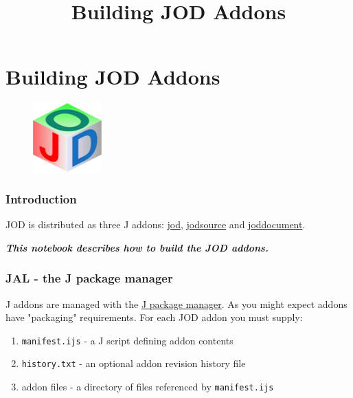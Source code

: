 \documentclass[11pt,letter,landscape]{article}
\title{Building JOD Addons}
\makeatletter
\def\maxwidth{\ifdim\Gin@nat@width>\linewidth\linewidth
    \else\Gin@nat@width\fi}
\let\Oldincludegraphics\includegraphics
\renewcommand{\includegraphics}[1]{\Oldincludegraphics[width=.8\maxwidth]{#1}}
\makeatother
\begin{document}
    
    
    \maketitle
    
    

    
    \section{Building JOD Addons}\label{building-jod-addons}

\begin{figure}
\centering
\includegraphics{inclusions/jodteenytinycube.png}
\caption{}
\end{figure}

    \subsubsection{Introduction}\label{introduction}

JOD is distributed as three J addons:
\href{https://code.jsoftware.com/wiki/Addons/general/jod}{jod},
\href{https://code.jsoftware.com/wiki/Addons/general/jodsource}{jodsource}
and
\href{https://code.jsoftware.com/wiki/Addons/general/joddocument}{joddocument}.

\textbf{\emph{This notebook describes how to build the JOD addons.}}

\subsubsection{JAL - the J package
manager}\label{jal---the-j-package-manager}

J addons are managed with the
\href{https://code.jsoftware.com/wiki/JAL/User_Guide}{J package
manager}. As you might expect addons have "packaging" requirements. For
each JOD addon you must supply:

\begin{enumerate}
\def\labelenumi{\arabic{enumi}.}
\item
  \texttt{manifest.ijs} - a J script defining addon contents
\item
  \texttt{history.txt} - an optional addon revision history file
\item
  addon files - a directory of files referenced by \texttt{manifest.ijs}
\end{enumerate}
\end{document}
